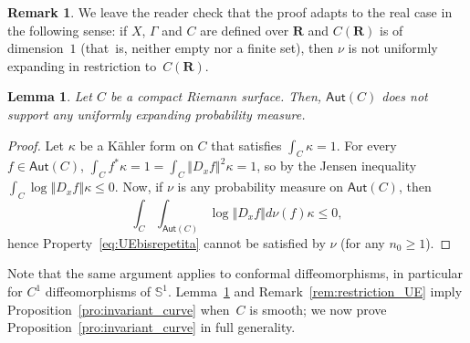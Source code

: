 \documentclass[JEP,XML,SOM,Unicode,published]{cedram}
\newcommand{\norm}[1]{{\left\Vert#1\right\Vert}}
\def\R{\mathbf{R}}
\newcommand\Aut{\mathsf{Aut}}
\theoremstyle{plain}
\newtheorem{lem}[thm]{Lemma}
\theoremstyle{definition}
\newtheorem{rem}[thm]{Remark}
\begin{document}
\begin{rem}\label{rem:invariant_curve}
We leave the reader check that the proof adapts to the real case in the following sense: if $X$, $\Gamma$ and $C$ are defined over $\R$ and $C(\R)$ is of dimension~$1$ (that~is, neither empty nor a finite set), then $\nu$ is not uniformly expanding in restriction to~$C(\R)$.
\end{rem}

\begin{lem} \label{lem:criterion_chung_curves}
Let $C$ be a compact Riemann surface. Then, $\Aut(C)$ does not support any uniformly expanding probability measure.
\end{lem}

\begin{proof}
Let $\kappa$ be a Kähler form on $C$ that satisfies $\int_C\kappa = 1$. For every $f\in \Aut(C)$,
$\int_C f^*\kappa = 1= \int_C \norm{D_xf}^2 \kappa= 1$, so by the Jensen inequality
$\int_C \log \norm{D_xf } \kappa\leq 0$. Now, if $\nu$ is any probability measure on $\Aut(C)$, then
\[
\int_C \int_{\Aut(C)} \log \norm{D_xf } d\nu(f) \kappa\leq 0,
\]
hence Property~\eqref{eq:UEbisrepetita} cannot be satisfied
by $\nu$ (for any $n_0\geq 1$).
\end{proof}

Note that the same argument applies to conformal diffeomorphisms, in particular for $C^1$
diffeomorphisms of $\mathbb S^1$. Lemma~\ref{lem:criterion_chung_curves} and Remark~\ref{rem:restriction_UE}
imply Proposition~\ref{pro:invariant_curve} when~$C$ is smooth; we now prove Proposition~\ref{pro:invariant_curve} in full generality.
\end{document}
